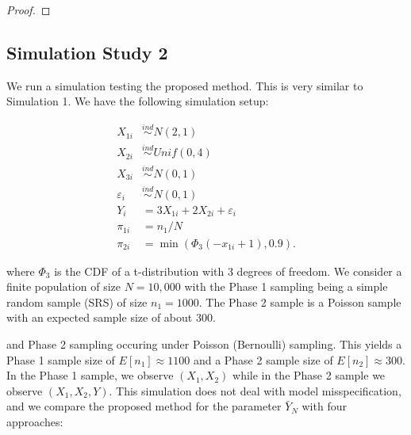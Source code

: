 \documentclass[12pt]{article}
\begin{document}
\begin{proof}
\end{proof}

\subsection{Simulation Study 2}

We run a simulation testing the proposed method. This is very similar to
Simulation 1. We have the following simulation setup:

$$
\begin{aligned}
X_{1i} &\stackrel{ind}{\sim} N(2, 1) \\
X_{2i} &\stackrel{ind}{\sim} Unif(0, 4) \\
X_{3i} &\stackrel{ind}{\sim} N(0, 1) \\
\varepsilon_i &\stackrel{ind}{\sim} N(0, 1) \\
Y_{i} &= 3 X_{1i} + 2 X_{2i} + \varepsilon_i \\
\pi_{1i} &= n_1 / N \\
\pi_{2i} &= \min(\Phi_3(-x_{1i} + 1), 0.9).
\end{aligned}
$$

where $\Phi_3$ is the CDF of a t-distribution with 3 degrees of freedom.
We consider a finite population of size $N = 10,000$ with the Phase 1 
sampling being a simple random sample (SRS) of size $n_1 = 1000$. The Phase 2
sample is a Poisson sample with an expected sample size of about 300.

and
Phase 2 sampling occuring under Poisson (Bernoulli) sampling. This yields a
Phase 1 sample
size of $E[n_1] \approx 1100$ and a Phase 2 sample size of
$E[n_2] \approx 300$. In the Phase 1 sample, we observe 
$(X_1, X_2)$ while in the Phase 2 sample we observe $(X_1, X_2, Y)$. This
simulation does not deal with model misspecification, and we compare the
proposed method for the parameter $\bar Y_N$ with four approaches:
\end{document}
